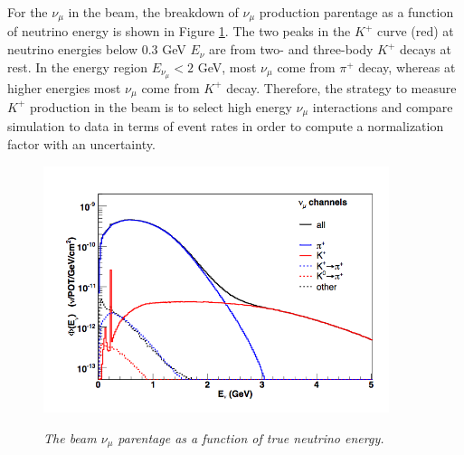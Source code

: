 For the $\nu_\mu$ in the beam, the breakdown of $\nu_\mu$ production parentage as a function of neutrino energy is shown in Figure \ref{bnb_numu_breakdown_fig}. The two peaks in the $K^+$ curve (red) at neutrino energies below 0.3 GeV $E_\nu$ are from two- and three-body $K^+$ decays at rest. In the energy region $E_{\nu_\mu} < 2$ GeV, most $\nu_\mu$ come from $\pi^+$ decay, whereas at higher energies most $\nu_\mu$ come from $K^+$ decay. Therefore, the strategy to measure $K^+$ production in the beam is to select high energy $\nu_\mu$ interactions and compare simulation to data in terms of event rates in order to compute a normalization factor with an uncertainty.\\

\begin{figure}[ht!]
\centering
	\includegraphics[width=0.9\textwidth]{Figures/bnb_numu_breakdown.png} \\
\caption{\textit{The beam $\nu_\mu$ parentage as a function of true neutrino energy.}}\label{bnb_numu_breakdown_fig}
\end{figure}

